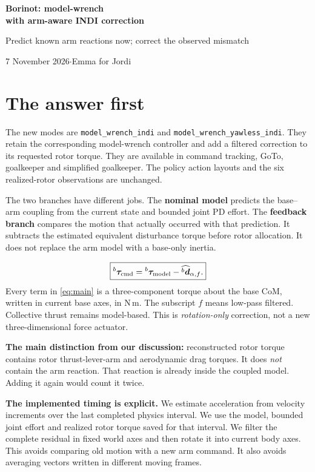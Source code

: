 \documentclass[11pt,a4paper]{article}
\newcommand{\vct}[1]{\boldsymbol{#1}}
\newcommand{\bv}[1]{{}^{b}\vct{#1}}
\begin{document}
\begin{center}
{\LARGE\bfseries Borinot: model-wrench\\with arm-aware INDI correction}\par
{\large Predict known arm reactions now; correct the observed mismatch}\par
7 November 2026\quad$\cdot$\quad Emma for Jordi
\end{center}

\section*{The answer first}

The new modes are \texttt{model\_wrench\_indi} and
\texttt{model\_wrench\_yawless\_indi}. They retain the corresponding model-wrench
controller and add a filtered correction to its requested rotor torque.
They are available in command tracking, GoTo, goalkeeper and simplified goalkeeper.
The policy action layouts and the six realized-rotor observations are unchanged.

The two branches have different jobs. The \textbf{nominal model} predicts the
base--arm coupling from the current state and bounded joint PD effort.
The \textbf{feedback branch} compares the motion that actually occurred with
that prediction. It subtracts the estimated equivalent disturbance torque
before rotor allocation. It does not replace the arm model with a base-only inertia.

\begin{equation}
\boxed{\bv\tau_{\rm cmd}=
       \bv\tau_{\rm model}-\widehat{\bv d}_{\alpha,f}.}
\label{eq:main}
\end{equation}
Every term in \eqref{eq:main} is a three-component torque about the base CoM,
written in current base axes, in N\,m. The subscript $f$ means low-pass filtered.
Collective thrust remains model-based. This is \emph{rotation-only} correction,
not a new three-dimensional force actuator.

\textbf{The main distinction from our discussion:}
reconstructed rotor torque contains rotor thrust-lever-arm and aerodynamic drag
torques. It does \emph{not} contain the arm reaction. That reaction is already
inside the coupled model. Adding it again would count it twice.

\textbf{The implemented timing is explicit.} We estimate acceleration from
velocity increments over the last completed physics interval. We use the model,
bounded joint effort and realized rotor torque saved for that interval.
We filter the complete residual in fixed world axes and then rotate it into
current body axes. This avoids comparing old motion with a new arm command.
It also avoids averaging vectors written in different moving frames.
\end{document}
